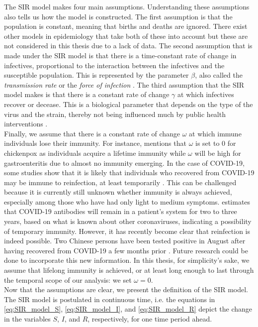 \documentclass[12pt]{article}
\begin{document}
	The SIR model makes four main assumptions. Understanding these assumptions also tells us how the model is constructed. The first assumption is that the population is constant, meaning that births and deaths are ignored. There exist other models in epidemiology that take both of these into account but these are not considered in this thesis due to a lack of data. The second assumption that is made under the SIR model is that there is a time-constant rate of change in infectives, proportional to the interaction between the infectives and the susceptible population. This is represented by the parameter $\beta$, also called the \textit{transmission rate} or the \textit{force of infection} \parencite{keeling2011modeling}. The third assumption that the SIR model makes is that there is a constant rate of change $\gamma$ at which infectives recover or decease. This is a biological parameter that depends on the type of the virus and the strain, thereby not being influenced much by public health interventions \parencite{adda2016economic}. \\
	
	Finally, we assume that there is a constant rate of change $\omega$ at which immune individuals lose their immunity. For instance, \textcite{adda2016economic} mentions that $\omega$ is set to 0 for chickenpox as individuals acquire a lifetime immunity while $\omega$ will be high for gastroenteritis due to almost no immunity emerging. In the case of COVID-19, some studies show that it is likely that individuals who recovered from COVID-19 may be immune to reinfection, at least temporarily \parencite{kirkcaldy2020covid}. This can be challenged because it is currently still unknown whether immunity is always achieved, especially among those who have had only light to medium symptoms. \textcite{leung_2020} estimates that COVID-19 antibodies will remain in a patient’s system for two to three years, based on what is known about other coronaviruses, indicating a possibility of temporary immunity. However, it has recently become clear that reinfection is indeed possible. Two Chinese persons have been tested positive in August after having recovered from COVID-19 a few months prior \parencite{bloomberg2020reinfection}. Future research could be done to incorporate this new information. In this thesis, for simplicity's sake, we assume that lifelong immunity is achieved, or at least long enough to last through the temporal scope of our analysis: we set $\omega = 0$. \\
	
	Now that the assumptions are clear, we present the definition of the SIR model. The SIR model is postulated in continuous time, i.e. the equations in \eqref{eq:SIR_model_S}, \eqref{eq:SIR_model_I}, and \eqref{eq:SIR_model_R} depict the change in the variables $S$, $I$, and $R$, respectively, for one time period ahead.
	
\end{document}
